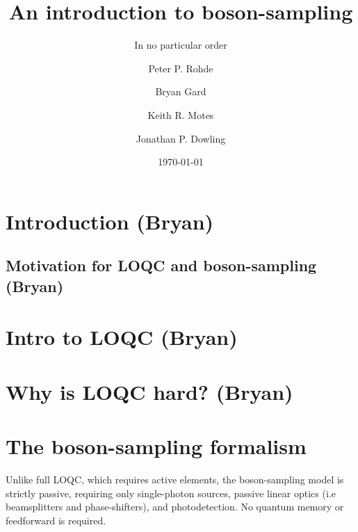 \documentclass[aps,pra,twocolumn,amsmath,amssymb,nofootinbib,superscriptaddress]{revtex4}
\begin{document}


%
% 

\title{An introduction to boson-sampling}

%
%

\author{In no particular order}

\author{Peter P. Rohde}

\author{Bryan Gard}

\author{Keith R. Motes}

\author{Jonathan P. Dowling}

\date{\today}

\frenchspacing

%
%

\begin{abstract}
\end{abstract}

\maketitle

\section{Introduction (Bryan)}

\subsection{Motivation for LOQC and boson-sampling (Bryan)}

\section{Intro to LOQC (Bryan)}

\section{Why is LOQC hard? (Bryan)}

\section{The boson-sampling formalism}

Unlike full LOQC, which requires active elements, the boson-sampling model is strictly passive, requiring only single-photon sources, passive linear optics (i.e beamsplitters and phase-shifters), and photodetection. No quantum memory or feedforward is required.
\end{document}
